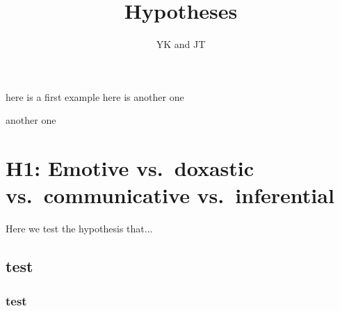 \documentclass[11pt,fleqn]{article}
\title{Hypotheses}
\author{YK and JT}
\newcommand{\6}{\mbox{$[\hspace*{-.6mm}[$}}
\newcommand{\9}{\mbox{$]\hspace*{-.6mm}]$}}
\begin{document}
\maketitle

\citealt{kiparsky-kiparsky70}

\begin{exe}
\ex here is a first example
\ex here is another one
\begin{xlist}
\ex another
\ex one
\end{xlist}
\end{exe}

\section{H1: Emotive vs.\ doxastic vs.\ communicative vs.\ inferential}

Here we test the hypothesis that...

\subsection{test}

\subsubsection{test}



\end{document}
